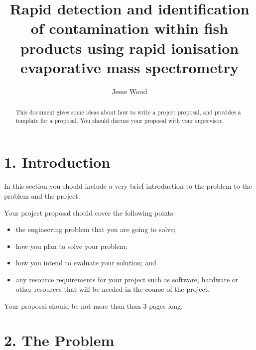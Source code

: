 \documentclass[11pt, a4paper, twoside, openright]{report}
\title{Rapid detection and identification of contamination within fish products using rapid ionisation evaporative mass spectrometry}
\author{Jesse Wood}
\date{}
\begin{document}
\frontmatter


\begin{abstract}
  This document gives some ideas about how to write a project
  proposal, and provides a template for a proposal. You should discuss
  your proposal with your supervisor.
\end{abstract}


\maketitle




\mainmatter


\section*{1. Introduction}

In this section you should include a very brief introduction to the
problem to the problem and the project.

Your project proposal should cover the following points:

\begin{itemize}
\item the engineering problem that you are going to solve;
\item how you plan to solve your problem;
\item how you intend to evaluate your solution; and
\item any resource requirements for your project such as software,
  hardware or other resources that will be needed in the course of the
  project.
\end{itemize}

Your proposal should be not more than than 3 pages long.

\section*{2. The Problem}
\end{document}

